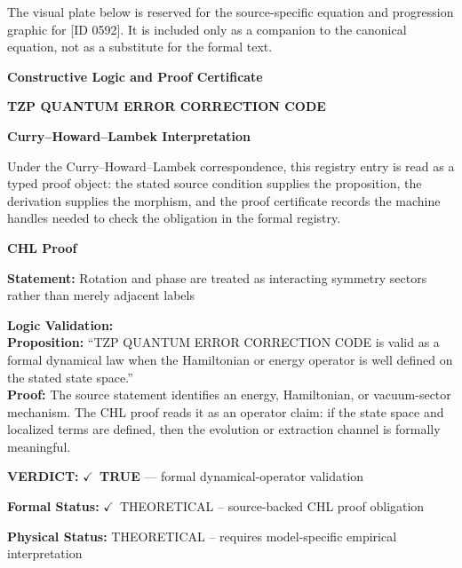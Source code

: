 \begingroup\footnotesize\sloppy
The visual plate below is reserved for the source-specific equation and progression graphic for [ID 0592]. It is included only as a companion to the canonical equation, not as a substitute for the formal text.
\par\endgroup
\ifTZPDarkEdition
{}
\fi

\clearpage
\begingroup\tzpsupportsetup
\noindent\textbf{\fontsize{10.8pt}{12.8pt}\selectfont [ID 0592] Constructive Logic and Proof Certificate}\par
\noindent\textbf{\fontsize{10pt}{12pt}\selectfont TZP QUANTUM ERROR CORRECTION CODE}\par
\vspace{0.45em}
\begingroup
\footnotesize
\setlength{\parskip}{0.22em}
\setlength{\parindent}{0pt}
\noindent\textbf{Curry--Howard--Lambek Interpretation}\par
Under the Curry--Howard--Lambek correspondence, this registry entry is read as a typed proof
object: the stated source condition supplies the proposition, the derivation supplies the
morphism, and the proof certificate records the machine handles needed to check the obligation
in the formal registry.

\vspace{0.45em}
\noindent\textbf{CHL Proof}\par
\textbf{Statement:} Rotation and phase are treated as interacting symmetry sectors rather than merely
adjacent labels

\textbf{Logic Validation:}\\
\textbf{Proposition:} ``TZP QUANTUM ERROR CORRECTION CODE is valid as a formal dynamical law when the
Hamiltonian or energy operator is well defined on the stated state space.''\\
\textbf{Proof:} The source statement identifies an energy, Hamiltonian, or vacuum-sector mechanism. The
CHL proof reads it as an operator claim: if the state space and localized terms are
defined, then the evolution or extraction channel is formally meaningful.

\textbf{VERDICT:} \ensuremath{\checkmark}\ \textbf{TRUE} --- formal dynamical-operator validation

\textbf{Formal Status:} \ensuremath{\checkmark}\ THEORETICAL -- source-backed CHL proof obligation

\textbf{Physical Status:} THEORETICAL -- requires model-specific empirical interpretation
\par\vspace{0.45em}
\par
\ifTZPDarkEdition
{}
\fi
\endgroup
\endgroup
